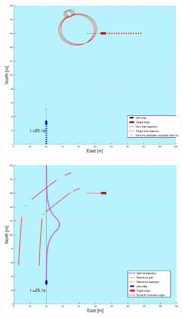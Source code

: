 \begin{figure}[ht!] %
    \begin{subfigure}[b]{0.49\textwidth}
        \centering
        \includegraphics[width=\textwidth]{Images/Figures/sving_HO/_Simple_0fig1_time=25}
    \end{subfigure}
    \hfill
    \begin{subfigure}[b]{0.499\textwidth}
        \centering
        \includegraphics[width=\textwidth]{Images/Figures/sving_HO/_Simple_0fig999_time=25}

\end{subfigure}
\end{figure}
